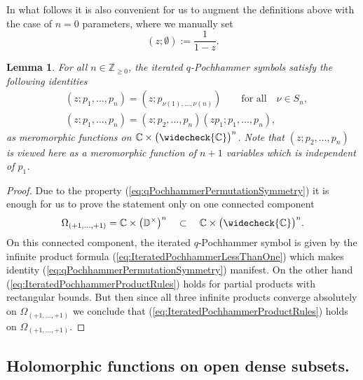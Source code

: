 \documentclass{amsart}
\newtheorem{lemma}[theorem]{Lemma}
\begin{document}
In what follows it is also convenient for us to augment the definitions above with the case of $n=0$ parameters, where we manually set
\begin{equation*}
(z;\emptyset):=\frac1{1-z}.
\end{equation*}

\begin{lemma}
For all $n\in\mathbb Z_{\geq0}$, the iterated $q$-Pochhammer symbols satisfy the following identities 
\begin{subequations}
\begin{align}
&(z;p_1,\dots,p_n)=(z;p_{\nu(1),\dots,\nu(n)})\qquad\textrm{for all}\quad\nu\in S_n,
\label{eq:qPochhammerPermutationSymmetry}\\
&(z;p_1,\dots,p_n)=(z;p_2,\dots,p_n)(zp_1;p_1,\dots,p_n),
\label{eq:IteratedPochhammerProductRules}
\end{align}
\end{subequations}
as meromorphic functions on $\mathbb C\times\big(\widecheck{\mathbb C}\big)^n$. Note that $(z;p_2,\dots,p_n)$ is viewed here as a meromorphic function of $n+1$ variables which is independent of $p_1$.
\end{lemma}
\begin{proof}
Due to the property (\ref{eq:qPochhammerPermutationSymmetry}) it is enough for us to prove the statement only on one connected component
\begin{equation*}
\Omega_{(+1,\dots,+1)}=\mathbb C\times\big(\mathbb D^\times\big)^n \quad\subset\quad \mathbb C\times\big(\widecheck{\mathbb C}\big)^n.
\end{equation*}
On this connected component, the iterated $q$-Pochhammer symbol is given by the infinite product formula (\ref{eq:IteratedPochhammerLessThanOne}) which makes identity (\ref{eq:qPochhammerPermutationSymmetry}) manifest. On the other hand (\ref{eq:IteratedPochhammerProductRules}) holds for partial products with rectangular bounds. But then since all three infinite products converge absolutely on $\Omega_{(+1,\dots,+1)}$ we conclude that (\ref{eq:IteratedPochhammerProductRules}) holds on $\Omega_{(+1,\dots,+1)}$.
\end{proof}

\subsection{Holomorphic functions on open dense subsets.}
\end{document}
